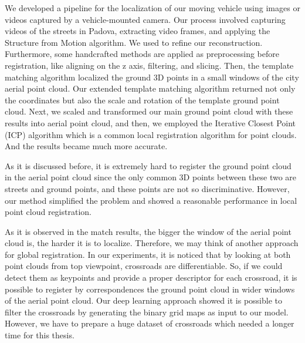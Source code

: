 \documentclass[11pt]{article}
\begin{document}
    We developed a pipeline for the localization of our moving vehicle using images or videos captured by
    a vehicle-mounted camera. Our process involved capturing videos of the streets in Padova, extracting
    video frames, and applying the Structure from Motion algorithm. We used \cite{lindenberger2021pixsfm}
    to refine our reconstruction. Furthermore, some handcrafted methods are applied as preprocessing before
    registration, like aligning on the z axis, filtering, and slicing. Then, the template matching algorithm
    localized the ground 3D points in a small windows of the city aerial point cloud. Our extended template matching
    algorithm returned not only the coordinates but also the scale and rotation of the template ground point cloud.
    Next, we scaled and transformed our main ground point cloud with these results into aerial point cloud, and then,
    we employed the Iterative Closest Point (ICP) algorithm which is a common local registration algorithm for
    point clouds. And the results became much more accurate.

    As it is discussed before, it is extremely hard to register the ground point cloud in the aerial point cloud
    since the only common 3D points between these two are streets and ground points, and these points
    are not so discriminative. However, our method simplified the problem and showed a reasonable performance
    in local point cloud registration.

    As it is observed in the match results, the bigger the window of the aerial point cloud is, the harder it is to localize.
    Therefore, we may think of another approach for global registration. In our experiments, it is noticed that by
    looking at both point clouds from top viewpoint, crossroads are differentiable. So, if we could detect them as
    keypoints and provide a proper descriptor for each crossroad, it is possible to register by correspondences
    the ground point cloud in wider windows of the aerial point cloud. Our deep learning approach showed it is
    possible to filter the crossroads by generating the binary grid maps as input to our model. However, we have to
    prepare a huge dataset of crossroads which needed a longer time for this thesis.
\end{document}
